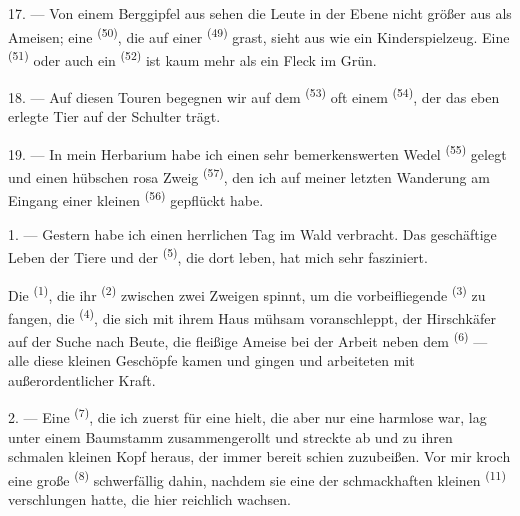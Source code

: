17. --- Von einem Berggipfel aus sehen die Leute in der Ebene nicht größer aus als
Ameisen; eine  \textsuperscript{(50)}, die auf einer
 \textsuperscript{(49)} grast, sieht aus wie ein Kinderspielzeug. Eine
 \textsuperscript{(51)} oder auch ein 
\textsuperscript{(52)} ist kaum mehr als ein Fleck im Grün.

18. --- Auf diesen Touren begegnen wir auf dem 
\textsuperscript{(53)} oft einem  \textsuperscript{(54)}, der das
eben erlegte Tier auf der Schulter trägt.

19. --- In mein Herbarium habe ich einen sehr bemerkenswerten Wedel
 \textsuperscript{(55)} gelegt und einen hübschen rosa Zweig
 \textsuperscript{(57)}, den ich auf meiner letzten Wanderung am
Eingang einer kleinen  \textsuperscript{(56)} gepflückt habe.

\VUsaut{3.0mm}
\VUsaut{3.0mm}

\VUsaut{3.0mm}

1. --- Gestern habe ich einen herrlichen Tag im Wald verbracht. Das geschäftige
Leben der Tiere und der  \textsuperscript{(5)}, die dort leben, hat
mich sehr fasziniert.

Die  \textsuperscript{(1)}, die ihr 
\textsuperscript{(2)} zwischen zwei Zweigen spinnt, um die vorbeifliegende
 \textsuperscript{(3)} zu fangen, die 
\textsuperscript{(4)}, die sich mit ihrem Haus mühsam voranschleppt, der Hirschkäfer
auf der Suche nach Beute, die fleißige Ameise bei der Arbeit neben dem
 \textsuperscript{(6)} --- alle diese kleinen Geschöpfe kamen
und gingen und arbeiteten mit außerordentlicher Kraft.

2. --- Eine  \textsuperscript{(7)}, die ich zuerst für eine
 hielt, die aber nur eine harmlose  war, lag
unter einem Baumstamm zusammengerollt und streckte ab und zu ihren schmalen kleinen
Kopf heraus, der immer bereit schien zuzubeißen. Vor mir kroch eine große
 \textsuperscript{(8)} schwerfällig dahin, nachdem sie eine der
schmackhaften kleinen  \textsuperscript{(11)} verschlungen
hatte, die hier reichlich wachsen.

